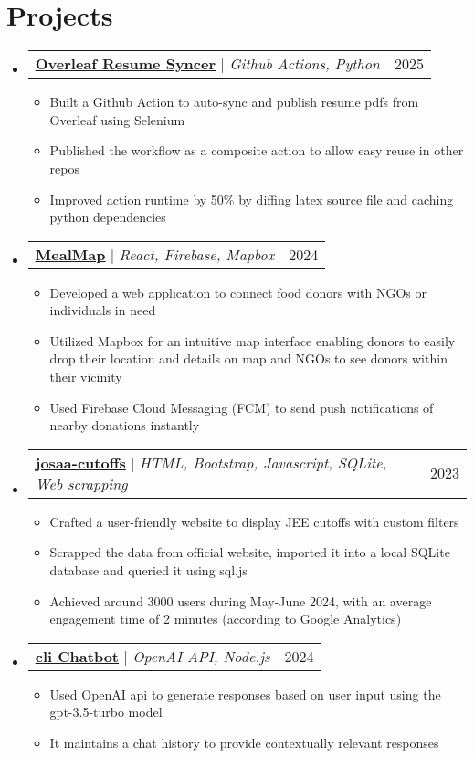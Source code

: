 \documentclass[letterpaper,11pt]{article}
\makeatletter
\newcommand{\resumeItem}[1]{
  \item\small{
    {#1 \vspace{-5pt}}
  }
}
\newcommand{\resumeProjectHeading}[2]{
    \item
    \begin{tabular*}{0.97\textwidth}{l@{\extracolsep{\fill}}r}
      \small#1 & #2 \\
    \end{tabular*}\vspace{0pt}
}
\newcommand{\resumeSubHeadingListStart}{\begin{itemize}[leftmargin=0.15in, label={}]}
\newcommand{\resumeSubHeadingListEnd}{\end{itemize}}
\newcommand{\resumeItemListStart}{\begin{itemize}}
\newcommand{\resumeItemListEnd}{\end{itemize}\vspace{3pt}}
\makeatother
\begin{document}
\section{Projects}
    \resumeSubHeadingListStart
        \resumeProjectHeading
          {\textbf{\href{https://github.com/Sbrjt/overleaf-resume-downloader}{\href{}{\underline{Overleaf Resume Syncer}}}}  $|$ \emph{Github Actions, Python}}{2025}
          \resumeItemListStart
            \resumeItem{Built a Github Action to auto-sync and publish resume pdfs from Overleaf using Selenium}
            \resumeItem{Published the workflow as a composite action to allow easy reuse in other repos}
             \resumeItem{Improved action runtime by 50\% by diffing latex source file and caching python dependencies}
          \resumeItemListEnd
        \resumeProjectHeading
          {\textbf{\href{https://github.com/Sbrjt/MealMap}{\href{}{\underline{MealMap}}}}  $|$ \emph{React, Firebase, Mapbox}}{2024}
          \resumeItemListStart
            \resumeItem{Developed a web application to connect food donors with NGOs or individuals in need}
            \resumeItem{Utilized Mapbox for an intuitive map interface enabling donors to easily drop their location and details on map and NGOs to see donors within their vicinity}
            \resumeItem{Used Firebase Cloud Messaging (FCM) to send push notifications of nearby donations instantly}
          \resumeItemListEnd
        \resumeProjectHeading
          {\textbf{\href{https://github.com/Sbrjt/josaa-cutoffs}{\href{}{\underline{josaa-cutoffs}}}} $|$ \emph{HTML, Bootstrap, Javascript, SQLite, Web scrapping}}{2023}
          \resumeItemListStart
            \resumeItem{Crafted a user-friendly website to display JEE cutoffs with custom filters}
            \resumeItem{Scrapped the data from official website, imported it into a local SQLite database and queried it using sql.js}
            \resumeItem{Achieved around 3000 users during May-June 2024, with an average engagement time of 2 minutes (according to Google Analytics)}
          \resumeItemListEnd
          
        \resumeProjectHeading
          {\textbf{\href{https://github.com/Sbrjt/Chatbot}{\href{}{\underline{cli Chatbot}}}}  $|$ \emph{OpenAI API, Node.js}}{2024}
          \resumeItemListStart
            \resumeItem{Used OpenAI api to generate responses based on user input using the gpt-3.5-turbo model}
            \resumeItem{It maintains a chat history to provide contextually relevant responses}
          \resumeItemListEnd
    \resumeSubHeadingListEnd
\end{document}
